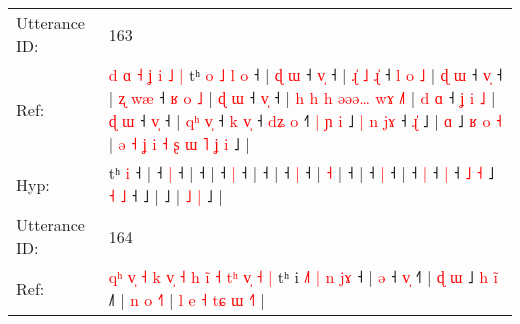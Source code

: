 \documentclass[10pt]{article}
\DeclareRobustCommand{\hl}[1]{{\textcolor{red}{#1}}}
\begin{document}
\begin{longtable}{ll}
 \\
\midrule
Utterance ID: & 163 \\
Ref: & \hl{d}\hl{ }\hl{ɑ}\hl{ }\hl{˧}\hl{ }\hl{ʝ}\hl{ }\hl{i}\hl{ }\hl{˩}\hl{ }\hl{|}\hl{ }tʰ\hl{ }\hl{o}\hl{ }\hl{˩}\hl{ }\hl{l} \hl{o} ˧ |\hl{ }\hl{ɖ}\hl{ }\hl{ɯ} ˧ \hl{v}\hl{̩} ˧ |\hl{ }\hl{ɻ}\hl{̍}\hl{ }\hl{˩}\hl{ }\hl{ɻ}\hl{̍} ˧\hl{ }\hl{l}\hl{ }\hl{o}\hl{ }\hl{˩} |\hl{ }\hl{ɖ}\hl{ }\hl{ɯ} ˧ \hl{v}\hl{̩} ˧ |\hl{ }\hl{ʐ}\hl{ }\hl{w}\hl{æ} ˧\hl{ }\hl{ʁ}\hl{ }\hl{o}\hl{ }\hl{˩} |\hl{ }\hl{ɖ}\hl{ }\hl{ɯ} ˧ \hl{v}\hl{̩} ˧ |\hl{ }\hl{h}\hl{ }\hl{h}\hl{ }\hl{h}\hl{ }\hl{ə}\hl{ə}\hl{ə}\hl{…}\hl{ }\hl{w}\hl{ɤ} \hl{˩}\hl{˥} |\hl{ }\hl{d}\hl{ }\hl{ɑ} ˧\hl{ }\hl{ʝ}\hl{ }\hl{i}\hl{ }\hl{˩} |\hl{ }\hl{ɖ}\hl{ }\hl{ɯ} ˧ \hl{v}\hl{̩} ˧ |\hl{ }\hl{q}\hl{ʰ}\hl{ }\hl{v}\hl{̩} ˧\hl{ }\hl{k} \hl{v}\hl{̩} ˧\hl{ }\hl{d}\hl{ʑ} \hl{o} ˧\hl{˥}\hl{ }\hl{|} \hl{ɲ} \hl{i} ˩\hl{ }\hl{|} \hl{n} \hl{j}\hl{ɤ} ˧\hl{ }\hl{ɻ}\hl{̍} ˩ |\hl{ }\hl{ɑ} ˩\hl{ }\hl{ʁ}\hl{ }\hl{o}\hl{ }\hl{˧} |\hl{ }\hl{ə}\hl{ }\hl{˧}\hl{ }\hl{ʝ}\hl{ }\hl{i}\hl{ }\hl{˧}\hl{ }\hl{ʂ}\hl{ }\hl{ɯ}\hl{ }\hl{˥} \hl{ʝ} \hl{i} ˩ |
 \\
Hyp: & \hl{}\hl{}\hl{}\hl{}\hl{}\hl{}\hl{}\hl{}\hl{}\hl{}\hl{}\hl{}\hl{}\hl{}tʰ\hl{}\hl{}\hl{}\hl{}\hl{}\hl{} \hl{i} ˧ |\hl{}\hl{}\hl{}\hl{} ˧ \hl{}\hl{|} ˧ |\hl{}\hl{}\hl{}\hl{}\hl{}\hl{}\hl{}\hl{} ˧\hl{}\hl{}\hl{}\hl{}\hl{}\hl{} |\hl{}\hl{}\hl{}\hl{} ˧ \hl{}\hl{|} ˧ |\hl{}\hl{}\hl{}\hl{}\hl{} ˧\hl{}\hl{}\hl{}\hl{}\hl{}\hl{} |\hl{}\hl{}\hl{}\hl{} ˧ \hl{}\hl{|} ˧ |\hl{}\hl{}\hl{}\hl{}\hl{}\hl{}\hl{}\hl{}\hl{}\hl{}\hl{}\hl{}\hl{}\hl{} \hl{}\hl{˧} |\hl{}\hl{}\hl{}\hl{} ˧\hl{}\hl{}\hl{}\hl{}\hl{}\hl{} |\hl{}\hl{}\hl{}\hl{} ˧ \hl{}\hl{|} ˧ |\hl{}\hl{}\hl{}\hl{}\hl{}\hl{} ˧\hl{}\hl{} \hl{}\hl{|} ˧\hl{}\hl{}\hl{} \hl{|} ˧\hl{}\hl{}\hl{} \hl{˩} \hl{˧} ˩\hl{}\hl{} \hl{˧} \hl{}\hl{˩} ˧\hl{}\hl{}\hl{} ˩ |\hl{}\hl{} ˩\hl{}\hl{}\hl{}\hl{}\hl{}\hl{} |\hl{}\hl{}\hl{}\hl{}\hl{}\hl{}\hl{}\hl{}\hl{}\hl{}\hl{}\hl{}\hl{}\hl{}\hl{}\hl{} \hl{˩} \hl{|} ˩ |
 \\
\midrule
Utterance ID: & 164 \\
Ref: & \hl{q}\hl{ʰ}\hl{ }\hl{v}\hl{̩}\hl{ }\hl{˧}\hl{ }\hl{k}\hl{ }\hl{v}\hl{̩}\hl{ }\hl{˧}\hl{ }\hl{h}\hl{ }\hl{i}\hl{̃}\hl{ }\hl{˧}\hl{ }\hl{t}\hl{ʰ}\hl{ }\hl{v}\hl{̩}\hl{ }\hl{˧}\hl{ }\hl{|}\hl{ }tʰ i\hl{ }\hl{˩}\hl{˥}\hl{ }\hl{|}\hl{ }\hl{n}\hl{ }\hl{j}\hl{ɤ} ˧ |\hl{ }\hl{ə} ˧ \hl{v}\hl{̩} ˧\hl{˥} |\hl{ }\hl{ɖ} \hl{ɯ} ˩\hl{ }\hl{h} \hl{i}\hl{̃} ˩\hl{˥} |\hl{ }\hl{n}\hl{ }\hl{o} \hl{˧}\hl{˥} |\hl{ }\hl{l}\hl{ }\hl{e}\hl{ }\hl{˧}\hl{ }\hl{t}\hl{ɕ}\hl{ }\hl{ɯ} \hl{˧}\hl{˥} |
 \\

\end{longtable}
\end{document}
